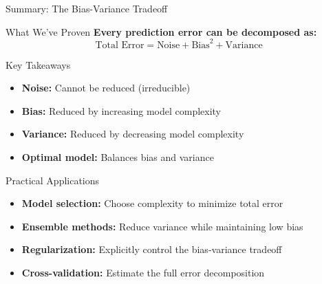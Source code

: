 \documentclass[10pt]{beamer}
\begin{document}
\begin{frame}{Summary: The Bias-Variance Tradeoff}
\begin{definitionbox}{What We've Proven}
\textbf{Every prediction error can be decomposed as:}
$$\text{Total Error} = \text{Noise} + \text{Bias}^2 + \text{Variance}$$
\end{definitionbox}

\begin{keypointsbox}{Key Takeaways}
\begin{itemize}
\item \textbf{Noise:} Cannot be reduced (irreducible)
\item \textbf{Bias:} Reduced by increasing model complexity
\item \textbf{Variance:} Reduced by decreasing model complexity
\item \textbf{Optimal model:} Balances bias and variance
\end{itemize}
\end{keypointsbox}

\begin{alertbox}{Practical Applications}
\begin{itemize}
\item \textbf{Model selection:} Choose complexity to minimize total error
\item \textbf{Ensemble methods:} Reduce variance while maintaining low bias
\item \textbf{Regularization:} Explicitly control the bias-variance tradeoff
\item \textbf{Cross-validation:} Estimate the full error decomposition
\end{itemize}
\end{alertbox}
\end{frame}
\end{document}
